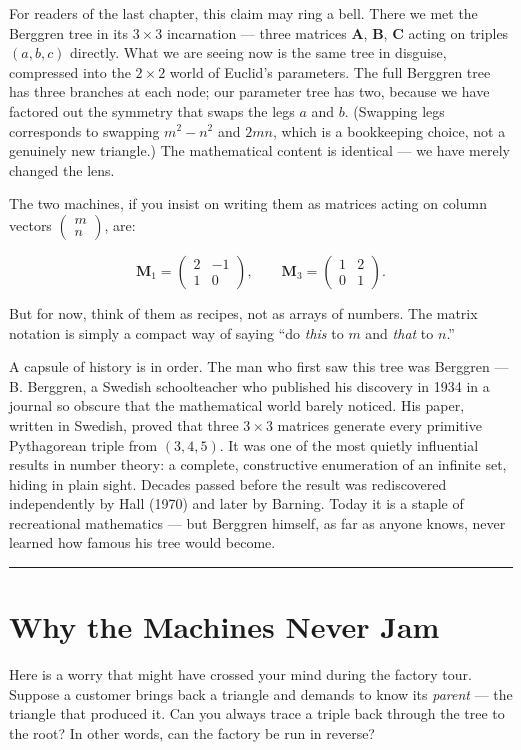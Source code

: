 For readers of the last chapter, this claim may ring a bell. There we met the Berggren tree in its \(3 \times 3\) incarnation --- three matrices \(\mathbf{A}\), \(\mathbf{B}\), \(\mathbf{C}\) acting on triples \((a, b, c)\) directly. What we are seeing now is the same tree in disguise, compressed into the \(2 \times 2\) world of Euclid's parameters. The full Berggren tree has three branches at each node; our parameter tree has two, because we have factored out the symmetry that swaps the legs \(a\) and \(b\). (Swapping legs corresponds to swapping \(m^2 - n^2\) and \(2mn\), which is a bookkeeping choice, not a genuinely new triangle.) The mathematical content is identical --- we have merely changed the lens.

The two machines, if you insist on writing them as matrices acting on column vectors \(\begin{pmatrix} m \\ n \end{pmatrix}\), are:

\[
\mathbf{M}_1 = \begin{pmatrix} 2 & -1 \\ 1 & 0 \end{pmatrix}, \qquad
\mathbf{M}_3 = \begin{pmatrix} 1 & 2 \\ 0 & 1 \end{pmatrix}.
\]

But for now, think of them as recipes, not as arrays of numbers. The matrix notation is simply a compact way of saying ``do \emph{this} to \(m\) and \emph{that} to \(n\).''

A capsule of history is in order. The man who first saw this tree was Berggren --- B. Berggren, a Swedish schoolteacher who published his discovery in 1934 in a journal so obscure that the mathematical world barely noticed. His paper, written in Swedish, proved that three \(3 \times 3\) matrices generate every primitive Pythagorean triple from \((3, 4, 5)\). It was one of the most quietly influential results in number theory: a complete, constructive enumeration of an infinite set, hiding in plain sight. Decades passed before the result was rediscovered independently by Hall (1970) and later by Barning. Today it is a staple of recreational mathematics --- but Berggren himself, as far as anyone knows, never learned how famous his tree would become.

\bigskip\noindent\rule{\linewidth}{0.4pt}\bigskip

\section{Why the Machines Never Jam}
Here is a worry that might have crossed your mind during the factory tour. Suppose a customer brings back a triangle and demands to know its \emph{parent} --- the triangle that produced it. Can you always trace a triple back through the tree to the root? In other words, can the factory be run in reverse?

